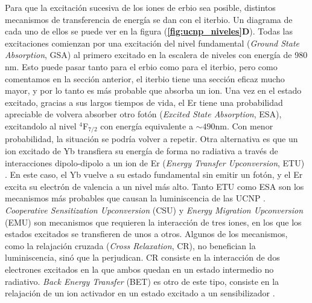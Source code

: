 Para que la excitación sucesiva de los iones de erbio sea posible, distintos mecanismos de transferencia de energía se dan con el iterbio.
Un diagrama de cada uno de ellos se puede ver en la figura (\textbf{\ref{fig:ucnp_niveles}D}).
Todas las excitaciones comienzan por una excitación del nivel fundamental (\textit{Ground State Absorption}, GSA) al primero excitado en la escalera de niveles con energía de 980 nm.
Esto puede pasar tanto para el erbio como para el iterbio, pero como comentamos en la sección anterior, el iterbio tiene una sección eficaz mucho mayor, y por lo tanto es más probable que absorba un ion.
Una vez en el estado excitado, gracias a sus largos tiempos de vida, el Er tiene una probabilidad apreciable de volvera absorber otro fotón (\textit{Excited State Absorption}, ESA), excitandolo al nivel $^4$F$_{7/2}$ con energía equivalente a $\sim 490$nm.
Con menor probabilidad, la situación se podría volver a repetir.
Otra alternativa es que un ion excitado de Yb transfiera su energía de forma no radiativa a través de interacciones dipolo-dipolo a un ion de Er (\textit{Energy Transfer Upconversion}, ETU) \cite{Auzel2004}.
En este caso, el Yb vuelve a su estado fundamental sin emitir un fotón, y el Er excita su electrón de valencia a un nivel más alto.
Tanto ETU como ESA son los mecanismos más probables que causan la luminiscencia de las UCNP \cite{pollnau2000}.
\textit{Cooperative Sensitization Upconversion} (CSU) y \textit{Energy Migration Upconversion} (EMU) son mecanismos que requieren la interacción de tres iones, en los que los estados excitados se transfieren de unos a otros.
Algunos de los mecanismos, como la relajación cruzada (\textit{Cross Relaxation}, CR), no benefician la luminiscencia, sinó que la perjudican.
CR consiste en la interacción de dos electrones excitados en la que ambos quedan en un estado intermedio no radiativo.
\textit{Back Energy Transfer} (BET) es otro de este tipo, consiste en la relajación de un ion activador en un estado excitado a un sensibilizador \cite{bujjamer2020}.

